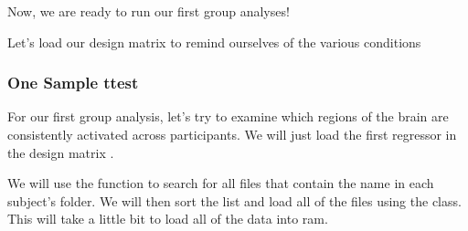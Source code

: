 \documentclass[letterpaper,10pt,english]{sphinxmanual}
\begin{document}
\begin{sphinxVerbatim}[commandchars=\\\{\}]
        \PYG{p}{[}\PYG{p}{[}\PYG{p}{]}    \PYG{p}{[}\PYG{p}{]}\PYG{p}{]}
        \PYG{p}{[}\PYG{p}{]}\PYG{p}{[}\PYG{p}{]} \PYG{p}{[}\PYG{p}{]}\PYG{p}{[}\PYG{p}{]}
\end{sphinxVerbatim}

Now, we are ready to run our first group analyses!

Let’s load our design matrix to remind ourselves of the various conditions


\subsubsection{One Sample t\sphinxhyphen{}test}
\label{\detokenize{content/Group_Analysis:one-sample-t-test}}
For our first group analysis, let’s try to examine which regions of the brain are consistently activated across participants. We will just load the first regressor in the design matrix \sphinxhyphen{} .

We will use the  function to search for all files that contain the name  in each subject’s folder. We will then sort the list and load all of the files using the  class.  This will take a little bit to load all of the data into ram.
\end{document}
